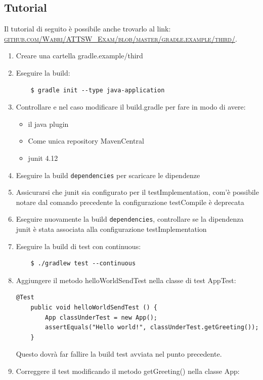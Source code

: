 \subsection{Tutorial}
Il tutorial di seguito è possibile anche trovarlo al link: \href{https://github.com/Wabri/ATTSW_Exam/blob/master/gradle.example/third/}{\textsc{github.com/Wabri/ATTSW\_Exam/blob/master/gradle.example/third/}}.
\begin{enumerate}
    \item Creare una cartella gradle.example/third
    \item Eseguire la build:
\begin{verbatim}
    $ gradle init --type java-application
\end{verbatim}
    \item Controllare e nel caso modificare il build.gradle per fare in modo di avere:
    \begin{itemize}
        \item il java plugin
        \item Come unica repository MavenCentral
        \item junit 4.12
    \end{itemize}
    \item Eseguire la build \texttt{dependencies} per scaricare le dipendenze
    \item Assicurarsi che junit sia configurato per il testImplementation, com'è possibile notare dal comando precedente la configurazione testCompile è deprecata
    \item Eseguire nuovamente la build \texttt{dependencies}, controllare se la dipendenza junit è stata associata alla configurazione testImplementation
    \item Eseguire la build di test con continuous:
    \begin{verbatim}
    $ ./gradlew test --continuous\end{verbatim}
    \item Aggiungere il metodo helloWorldSendTest nella classe di test AppTest:
    \begin{lstlisting}[frame=single]
    @Test 
    public void helloWorldSendTest () {
	    App classUnderTest = new App();
	    assertEquals("Hello world!", classUnderTest.getGreeting());
    }
    \end{lstlisting}
    Questo dovrà far fallire la build test avviata nel punto precedente.
    \item Correggere il test modificando il metodo getGreeting() nella classe App:

\end{enumerate}
